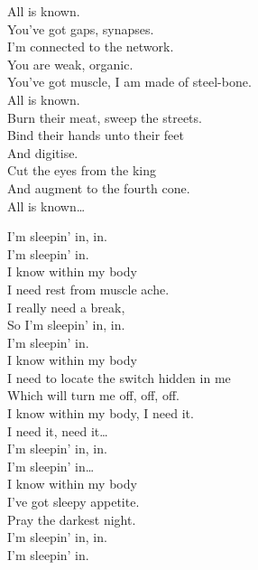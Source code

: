 All is known. \\

You've got gaps, synapses. \\
I'm connected to the network. \\
You are weak, organic. \\
You've got muscle, I am made of steel-bone. \\

All is known. \\

Burn their meat, sweep the streets. \\
Bind their hands unto their feet \\
And digitise. \\
Cut the eyes from the king \\
And augment to the fourth cone. \\

All is known… \\





I'm sleepin' in, in. \\
I'm sleepin' in. \\

I know within my body \\
I need rest from muscle ache. \\
I really need a break, \\
So I'm sleepin' in, in. \\
I'm sleepin' in. \\

I know within my body \\
I need to locate the switch hidden in me \\
Which will turn me off, off, off. \\
I know within my body, I need it. \\

I need it, need it… \\

I'm sleepin' in, in. \\
I'm sleepin' in… \\

I know within my body \\
I've got sleepy appetite. \\
Pray the darkest night. \\
I'm sleepin' in, in. \\
I'm sleepin' in. \\

